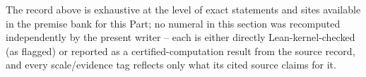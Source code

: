 The record above is exhaustive at the level of exact statements and sites available in the premise
bank for this Part; no numeral in this section was recomputed independently by the present writer --
each is either directly Lean-kernel-checked (as flagged) or reported as a certified-computation
result from the source record, and every scale/evidence tag reflects only what its cited source
claims for it.

